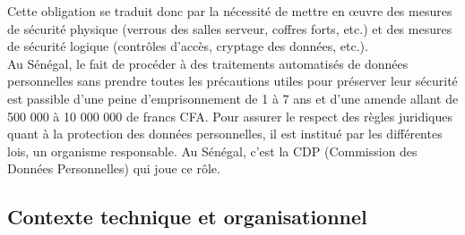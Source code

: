 Cette obligation se traduit donc par la nécessité de mettre en œuvre des mesures de sécurité physique (verrous des salles serveur, coffres forts, etc.) et des mesures de sécurité logique (contrôles d’accès, cryptage des données, etc.).\\
Au Sénégal, le fait de procéder à des traitements automatisés de données personnelles sans prendre toutes les précautions utiles pour préserver leur sécurité est passible d’une peine d’emprisonnement de 1 à 7 ans et d’une amende allant de 500 000 à 10 000 000 de francs CFA. Pour assurer le respect des règles juridiques quant à la protection des données personnelles, il est institué par les différentes lois, un organisme responsable. Au Sénégal, c’est la CDP (Commission des Données Personnelles)  qui joue ce rôle.

\subsection{Contexte technique et organisationnel}
